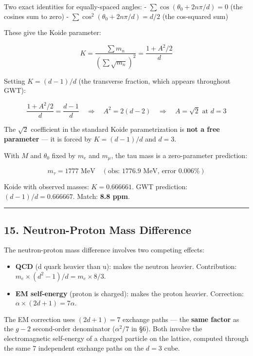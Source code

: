 \documentclass[
]{article}
\providecommand{\tightlist}{%
  \setlength{\itemsep}{0pt}\setlength{\parskip}{0pt}}
\begin{document}
Two exact identities for equally-spaced angles: -
\(\sum \cos(\theta_0 + 2n\pi/d) = 0\) (the cosines sum to zero) -
\(\sum \cos^2(\theta_0 + 2n\pi/d) = d/2\) (the cos-squared sum)

These give the Koide parameter:

\[K = \frac{\sum m_n}{(\sum \sqrt{m_n})^2} = \frac{1 + A^2/2}{d}\]

Setting \(K = (d\!-\!1)/d\) (the transverse fraction, which appears
throughout GWT):

\[\frac{1 + A^2/2}{d} = \frac{d-1}{d} \quad \Rightarrow \quad A^2 = 2(d-2) \quad \Rightarrow \quad A = \sqrt{2} \text{ at } d = 3\]

The \(\sqrt{2}\) coefficient in the standard Koide parametrization is
\textbf{not a free parameter} --- it is forced by \(K = (d\!-\!1)/d\)
and \(d = 3\).

With \(M\) and \(\theta_0\) fixed by \(m_e\) and \(m_\mu\), the tau mass
is a zero-parameter prediction:

\[m_\tau = 1777 \text{ MeV} \quad (\text{obs: } 1776.9 \text{ MeV, error } 0.006\%)\]

Koide with observed masses: \(K = 0.666661\). GWT prediction:
\((d\!-\!1)/d = 0.666667\). Match: \textbf{8.8 ppm}.

\begin{center}\rule{0.5\linewidth}{0.5pt}\end{center}

\subsection{15. Neutron-Proton Mass
Difference}\label{neutron-proton-mass-difference}

The neutron-proton mass difference involves two competing effects:

\begin{itemize}
\tightlist
\item
  \textbf{QCD} (d quark heavier than u): makes the neutron heavier.
  Contribution: \(m_e \times (d^2\!-\!1)/d = m_e \times 8/3\).
\item
  \textbf{EM self-energy} (proton is charged): makes the proton heavier.
  Correction: \(\alpha \times (2d\!+\!1) = 7\alpha\).
\end{itemize}

The EM correction uses \((2d\!+\!1) = 7\) exchange paths --- the
\textbf{same factor} as the \(g\!-\!2\) second-order denominator
(\(\alpha^2/7\) in §6). Both involve the electromagnetic self-energy of
a charged particle on the lattice, computed through the same 7
independent exchange paths on the \(d = 3\) cube.
\end{document}
